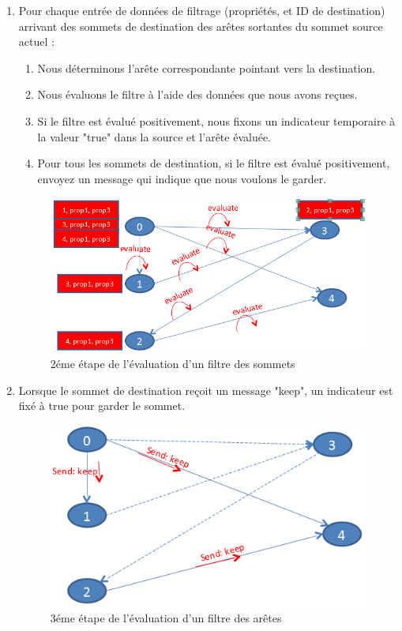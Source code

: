 \begin{enumerate}[label=\arabic*)]
\item  Pour chaque entrée de données de filtrage (propriétés, et ID de destination) arrivant des sommets de destination des arêtes sortantes du sommet source actuel :
    \begin{enumerate}[label=\alph*)]
    \item  Nous déterminons l'arête correspondante pointant vers la destination.
    \item  Nous évaluons le filtre à l'aide des données que nous avons reçues.
    \item  Si le filtre est évalué positivement, nous fixons un indicateur temporaire à la valeur "true" dans la source et l'arête évaluée.
    \item  Pour tous les sommets de destination, si le filtre est évalué positivement, envoyez un message qui indique que nous voulons le garder.
    \end{enumerate}
\begin{figure}[H]  
  \centering
    \includegraphics[width=1\textwidth]{chapitre3/Figures/EdgeFilter2.png}
  \caption{2éme étape de l'évaluation d'un filtre des sommets}
\end{figure}

\item  Lorsque le sommet de destination reçoit un message "keep", un indicateur est fixé à true pour garder le sommet.
\begin{figure}[H]
  \centering
    \includegraphics[width=1\textwidth]{chapitre3/Figures/EdgeFilter3.png}
  \caption{3éme étape de l'évaluation d'un filtre des arêtes}
\end{figure}


\end{enumerate}
